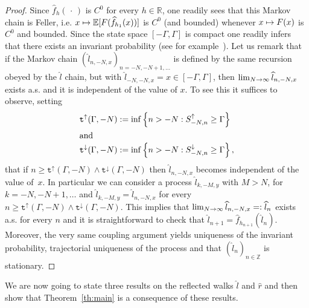 \documentclass[AHL,Unicode,longabstracts,published]{cedram}
\newcommand{\bbE}{\mathbb{E}}
\newcommand{\bbR}{\mathbb{R}}
\newcommand{\bbZ}{\mathbb{Z}}
\newcommand{\gG}{\Gamma}
\newcommand{\ttt}{\mathtt{t}}
\newcommand{\ttdown}{\ttt^\downarrow}
\newcommand{\ttup}{\ttt^\uparrow}
\newcommand{\ls}{\widehat{l}}
\newcommand{\rs}{\widehat{r}}
\renewcommand*{\to}{\mathchoice{\longrightarrow}{\rightarrow}{\rightarrow}{\rightarrow}}
\let\oldmapsto\mapsto
\renewcommand*{\mapsto}{\mathchoice{\longmapsto}{\oldmapsto}{\oldmapsto}{\oldmapsto}}
\begin{document}
\begin{proof}
Since $\widehat f_h(\,\cdot\,)$ is $C^0$ for every $h\in \bbR$, one readily sees that this Markov chain is Feller, i.e. $x \mapsto \bbE[F(\widehat f_{h_1}(x))]$ is $C^0$ (and bounded) whenever $x \mapsto F(x)$ is $C^0$ and bounded. Since the state space $[-\gG, \gG]$ is compact one readily infers that there exists an invariant probability (see for example~\cite[Section~12.3]{cf:MC}). Let us remark that if the Markov chain $(\ls_{n,-N,x})_{n=-N, -N+1, \dots}$ is defined by the same recursion obeyed by the $\ls$ chain, but with $\ls_{-N,-N,x}= x \in [-\gG,\gG]$, then $\lim_{N \to \infty} \ls_{n,-N,x}$ exists a.s. and it is independent of the value of $x$. To see this it suffices to observe, setting
\begin{align}
\ttup(\gG,-N) &:= \inf\left\{n> -N: S^\uparrow_{-N, n}\ge\gG\right\}\\
\intertext{and}
\ttdown(\gG, -N) &:= \inf\left\{n> -N: S^\downarrow_{-N, n}\ge \gG\right\},
\end{align}
that if $n\ge \ttup(\gG,-N) \wedge \ttdown(\gG, -N)$ then $\ls_{n,-N,x}$ becomes independent of the value of~$x$. In particular we can consider a process $\ls_{k, -M,y}$ with $M>N$, for $k=-N,-N+1, \dots$ and $\ls_{k,-M,y}=\ls_{n, -N,x}$ for every $n\ge \ttup(\gG,-N) \wedge \ttdown(\gG, -N)$. This implies that $\lim_{N \to \infty}\ls_{n, -N,x}=: \ls _n$ exists a.s. for every $n$ and it is straightforward to check that $\ls_{n+1}= \widehat f_{h_{n+1}}(\ls_n)$. Moreover, the very same coupling argument yields uniqueness of the invariant probability, trajectorial uniqueness of the process and that $(\ls_n)_{n \in \bbZ}$ is stationary.
\end{proof}


We are now going to state three results on the reflected walks $\ls$ and $\rs$ and then show that Theorem~\ref{th:main} is a consequence of these results.
\end{document}
